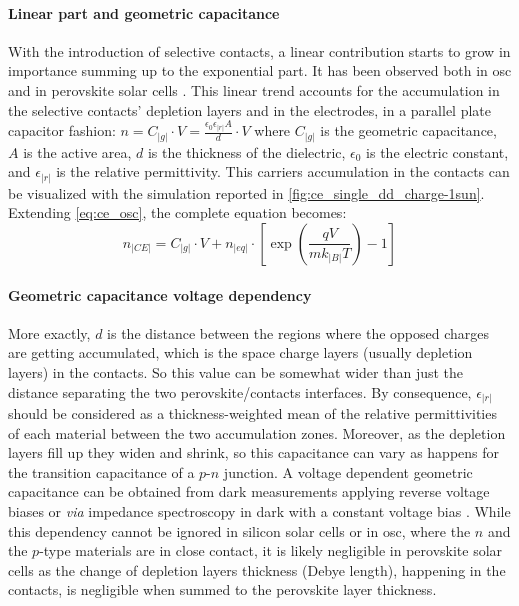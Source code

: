		\paragraph{Linear part and geometric capacitance}
		With the introduction of selective contacts, a linear contribution starts to grow in importance summing up to the exponential part.
		It has been observed both in \gls{osc} \cite{Ryan2017a,Credgington2014} and in perovskite solar cells \cite{Gelmetti2017,Wheeler2017,Du2018}.
		This linear trend accounts for the accumulation in the selective contacts' depletion layers and in the electrodes, in a parallel plate capacitor fashion: $n = C_|g| \cdot V = \frac{\epsilon_0 \epsilon_|r| A}{d} \cdot V$ where $C_|g|$ is the geometric capacitance, $A$ is the active area, $d$ is the thickness of the dielectric, $\epsilon_0$ is the electric constant, and $\epsilon_|r|$ is the relative permittivity.
		This carriers accumulation in the contacts can be visualized with the simulation reported in \cref{fig:ce_single_dd_charge-1sun}.
		Extending \cref{eq:ce_osc}, the complete equation becomes:
		\begin{equation}\label{eq:ce_full}
			n_|CE| = C_|g| \cdot V + n_|eq| \cdot \left[\exp(\frac{qV}{mk_|B|T}) - 1\right]
		\end{equation}
		
		\paragraph{Geometric capacitance voltage dependency}
		More exactly, $d$ is the distance between the regions where the opposed charges are getting accumulated, which is the space charge layers (usually depletion layers) in the contacts.
		So this value can be somewhat wider than just the distance separating the two perovskite/contacts interfaces.
		By consequence, $\epsilon_|r|$ should be considered as a thickness\hyp{}weighted mean of the relative permittivities of each material between the two accumulation zones.
		Moreover, as the depletion layers fill up they widen and shrink, so this capacitance can vary as happens for the transition capacitance of a $p$-$n$ junction.
		A voltage dependent geometric capacitance can be obtained from dark  measurements applying reverse voltage biases \cite{Kiermasch2018} or \textsl{via} impedance spectroscopy in dark with a constant voltage bias \cite{Brus2016,Pockett2015}.
		While this dependency cannot be ignored in silicon solar cells or in \gls{osc}, where the $n$ and the $p$-type materials are in close contact, it is likely negligible in perovskite solar cells as the change of depletion layers thickness (Debye length), happening in the contacts, is negligible when summed to the perovskite layer thickness.

